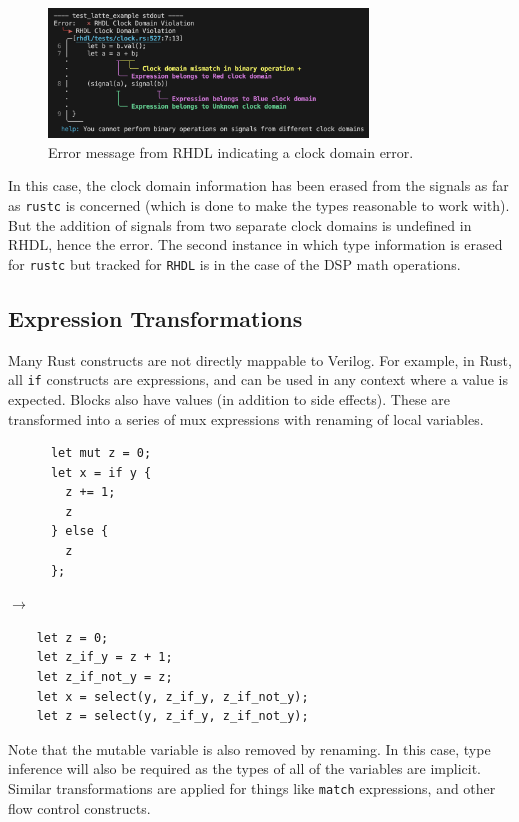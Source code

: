 \documentclass[sigplan,screen,sigconf]{acmart}
\begin{document}
\begin{figure}[h]
  \centering
  \includegraphics[width=8.5cm]{clock_error.png}
  \caption{Error message from RHDL indicating a clock domain error.}
\end{figure}

In this case, the clock domain information has been erased from the signals as far as \verb|rustc| is concerned (which is done to make the types reasonable to work with).  But the addition of signals from 
two separate clock domains is undefined in RHDL, hence the error.  The second instance in which type information is erased for \verb|rustc| but tracked for \verb|RHDL| is in the case of the DSP math operations.

\subsection{Expression Transformations}
Many Rust constructs are not directly mappable to Verilog.  For example, in Rust, all \verb|if| constructs are expressions, and can be used in any context where a value is expected.  Blocks also have values (in addition to side effects).  These are transformed into a series of mux expressions with renaming of local variables.

\begin{center}
  \begin{minipage}{0.25\linewidth}
    \begin{verbatim}
      let mut z = 0;
      let x = if y {
        z += 1;
        z
      } else {
        z
      };
    \end{verbatim}
    \end{minipage}
    $\rightarrow$
    \begin{minipage}{0.60\linewidth}
  \begin{verbatim}
    let z = 0;
    let z_if_y = z + 1;
    let z_if_not_y = z;
    let x = select(y, z_if_y, z_if_not_y);
    let z = select(y, z_if_y, z_if_not_y);
  \end{verbatim}
\end{minipage}
\end{center}
Note that the mutable variable is also removed by renaming.  In this case, type inference will also be required as the types of all of the variables are implicit.  Similar transformations are applied for things like \verb|match| expressions, and other flow control constructs.
\end{document}
